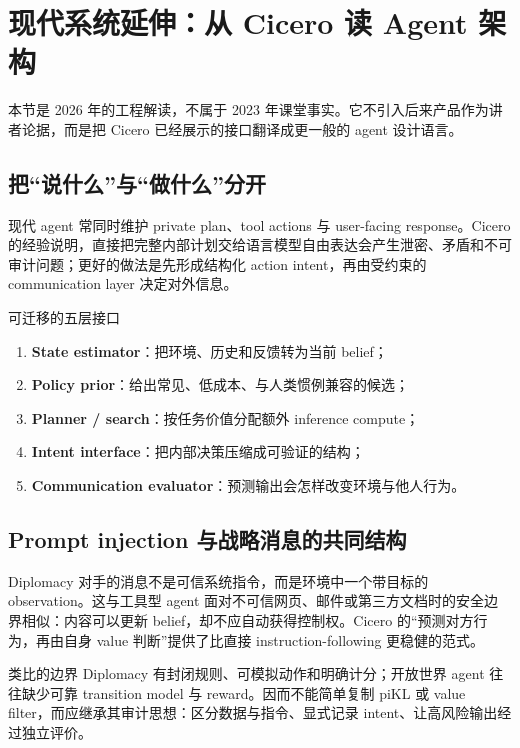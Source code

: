 \section{现代系统延伸：从 Cicero 读 Agent 架构}

本节是 2026 年的工程解读，不属于 2023 年课堂事实。它不引入后来产品作为讲者论据，而是把 Cicero 已经展示的接口翻译成更一般的 agent 设计语言。

\subsection{把“说什么”与“做什么”分开}

现代 agent 常同时维护 private plan、tool actions 与 user-facing response。Cicero 的经验说明，直接把完整内部计划交给语言模型自由表达会产生泄密、矛盾和不可审计问题；更好的做法是先形成结构化 action intent，再由受约束的 communication layer 决定对外信息。

\begin{knowledgebox}{可迁移的五层接口}
\begin{enumerate}
  \item \textbf{State estimator}：把环境、历史和反馈转为当前 belief；
  \item \textbf{Policy prior}：给出常见、低成本、与人类惯例兼容的候选；
  \item \textbf{Planner / search}：按任务价值分配额外 inference compute；
  \item \textbf{Intent interface}：把内部决策压缩成可验证的结构；
  \item \textbf{Communication evaluator}：预测输出会怎样改变环境与他人行为。
\end{enumerate}
\end{knowledgebox}

\subsection{Prompt injection 与战略消息的共同结构}

Diplomacy 对手的消息不是可信系统指令，而是环境中一个带目标的 observation。这与工具型 agent 面对不可信网页、邮件或第三方文档时的安全边界相似：内容可以更新 belief，却不应自动获得控制权。Cicero 的“预测对方行为，再由自身 value 判断”提供了比直接 instruction-following 更稳健的范式。

\begin{warningbox}{类比的边界}
Diplomacy 有封闭规则、可模拟动作和明确计分；开放世界 agent 往往缺少可靠 transition model 与 reward。因而不能简单复制 piKL 或 value filter，而应继承其审计思想：区分数据与指令、显式记录 intent、让高风险输出经过独立评价。
\end{warningbox}

